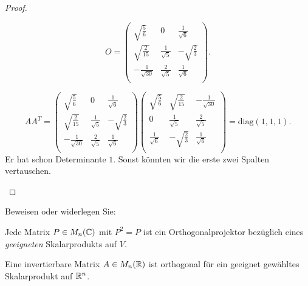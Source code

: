 \begin{proof}
\begin{parts}
	\[
	O=\left(
\begin{array}{ccc}
 \sqrt{\frac{5}{6}} & 0 & \frac{1}{\sqrt{6}} \\
 \sqrt{\frac{2}{15}} & \frac{1}{\sqrt{5}} & -\sqrt{\frac{2}{3}} \\
 -\frac{1}{\sqrt{30}} & \frac{2}{\sqrt{5}} & \frac{1}{\sqrt{6}} \\
\end{array}
\right) 
	.\] 
\item 
	\[
	A A^T=\left(
\begin{array}{ccc}
 \sqrt{\frac{5}{6}} & 0 & \frac{1}{\sqrt{6}} \\
 \sqrt{\frac{2}{15}} & \frac{1}{\sqrt{5}} & -\sqrt{\frac{2}{3}} \\
 -\frac{1}{\sqrt{30}} & \frac{2}{\sqrt{5}} & \frac{1}{\sqrt{6}} \\
\end{array}
\right) 
\left(
\begin{array}{ccc}
 \sqrt{\frac{5}{6}} & \sqrt{\frac{2}{15}} & -\frac{1}{\sqrt{30}} \\
 0 & \frac{1}{\sqrt{5}} & \frac{2}{\sqrt{5}} \\
 \frac{1}{\sqrt{6}} & -\sqrt{\frac{2}{3}} & \frac{1}{\sqrt{6}} \\
\end{array}
\right)=\text{diag}(1,1,1)
	.\] 
	Er hat schon Determinante $1$. Sonst könnten wir die erste zwei Spalten vertauschen.\qedhere
	\end{parts}
\end{proof}
\begin{Problem}
	Beweisen oder widerlegen Sie:
	\begin{parts}
	\item Jede Matrix $P\in M_n(\mathbb{C})$ mit $P^2=P$ ist ein Orthogonalprojektor bezüglich eines \emph{geeigneten} Skalarprodukts auf $V$.
	\item Eine invertierbare Matrix $A\in M_n(\mathbb{R})$ ist orthogonal f\"{u}r ein geeignet gewähltes Skalarprodukt auf $\mathbb{R}^n$.
	\end{parts}
\end{Problem}
